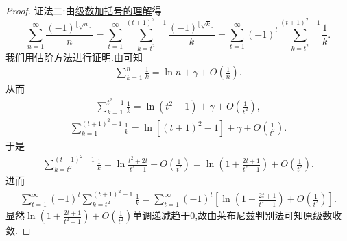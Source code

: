 \documentclass[../../main.tex]{subfiles}
\begin{document}
\begin{proof}
{\color{blue}证法二:}由\hyperref[theorem:级数加括号的理解]{级数加括号的理解}得
\[
\sum_{n=1}^{\infty}{\frac{(-1)^{\lfloor \sqrt{n} \rfloor}}{n}}=\sum_{t=1}^{\infty}{\sum_{k=t^2}^{(t+1)^2-1}{\frac{\left( -1 \right) ^{\lfloor \sqrt{k} \rfloor}}{k}}}=\sum_{t=1}^{\infty}{\left( -1 \right) ^t\sum_{k=t^2}^{(t+1)^2-1}{\frac{1}{k}}}.
\]
我们用估阶方法进行证明.由可知
\begin{align*}
\sum_{k=1}^n{\frac{1}{k}}=\ln n+\gamma +O\left( \frac{1}{n} \right) .
\end{align*}
从而
\begin{align*}
\sum_{k=1}^{t^2-1}{\frac{1}{k}}=\ln \left( t^2-1 \right) +\gamma +O\left( \frac{1}{t^2} \right) ,
\end{align*}
\begin{align*}
\sum_{k=1}^{\left( t+1 \right) ^2-1}{\frac{1}{k}}=\ln \left[ \left( t+1 \right) ^2-1 \right] +\gamma +O\left( \frac{1}{t^2} \right) .
\end{align*}
于是
\begin{align*}
\sum_{k=t^2}^{\left( t+1 \right) ^2-1}{\frac{1}{k}}=\ln \frac{t^2+2t}{t^2-1}+O\left( \frac{1}{t^2} \right) =\ln \left( 1+\frac{2t+1}{t^2-1} \right) +O\left( \frac{1}{t^2} \right) .
\end{align*}
进而
\begin{align*}
\sum_{t=1}^{\infty}{\left( -1 \right) ^t\sum_{k=t^2}^{(t+1)^2-1}{\frac{1}{k}}}=\sum_{t=1}^{\infty}{\left( -1 \right) ^t\left[ \ln \left( 1+\frac{2t+1}{t^2-1} \right) +O\left( \frac{1}{t^2} \right) \right]}.
\end{align*}
显然$\ln \left( 1+\frac{2t+1}{t^2-1} \right) +O\left( \frac{1}{t^2} \right)$单调递减趋于$0$,故由莱布尼兹判别法可知原级数收敛.
\end{proof}
\end{document}
